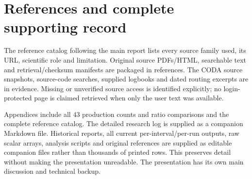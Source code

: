 \section{References and complete supporting record}
The reference catalog following the main report lists every source family used, its URL, scientific role and limitation. Original source PDFs/HTML, searchable text and retrieval/checksum manifests are packaged in references. The CODA source snapshots, source-code searches, supplied logbooks and dated routing excerpts are in evidence. Missing or unverified source access is identified explicitly; no login-protected page is claimed retrieved when only the user text was available.


Appendices include all 43 production counts and ratio comparisons and the complete reference catalog. The detailed research log is supplied as a companion Markdown file. Historical reports, all current per-interval/per-run outputs, raw scalar arrays, analysis scripts and original references are supplied as editable companion files rather than thousands of printed rows. This preserves detail without making the presentation unreadable. The presentation has its own main discussion and technical backup.

